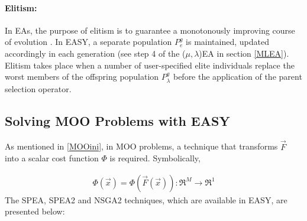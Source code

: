 

\paragraph{Elitism:}
In EAs, the purpose of elitism is to guarantee a monotonously improving course of evolution \cite{Back1996}. In EASY, a separate population $P_e^g$ is maintained, updated accordingly in each generation (see step 4 of the ($\mu,\lambda$)EA in section \ref{MLEA}). Elitism takes place when a number of user-specified elite individuals replace the worst members of the offspring population $P^g_{\lambda}$ before the application of the parent selection operator.
  
\subsection{Solving MOO Problems with EASY}
\label{MOO}
As mentioned in \ref{MOOini}, in MOO problems, a technique that transforms $\vec{F}$ into a scalar cost function $\Phi$ is required. Symbolically,

\begin{eqnarray}
    \Phi(\vec{x})=\Phi(\vec{F}(\vec{x})) :\Re ^M \rightarrow \Re ^1 
	\label{MOOeq}
\end{eqnarray}
The SPEA, SPEA2 and NSGA2 techniques, which are available in EASY, are presented below:

